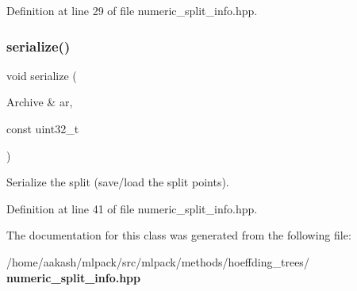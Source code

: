 Definition at line 29 of file numeric\+\_\+split\+\_\+info.\+hpp.

\mbox{\label{classmlpack_1_1tree_1_1NumericSplitInfo_a65cba07328997659bec80b9879b15a51}} 
\subsubsection{serialize()}
{\footnotesize\ttfamily void serialize (\begin{DoxyParamCaption}\item[{Archive \&}]{ar,  }\item[{const uint32\+\_\+t}]{ }\end{DoxyParamCaption})\hspace{0.3cm}{\ttfamily [inline]}}



Serialize the split (save/load the split points). 



Definition at line 41 of file numeric\+\_\+split\+\_\+info.\+hpp.



The documentation for this class was generated from the following file\+:\begin{DoxyCompactItemize}
\item 
/home/aakash/mlpack/src/mlpack/methods/hoeffding\+\_\+trees/\textbf{ numeric\+\_\+split\+\_\+info.\+hpp}\end{DoxyCompactItemize}
